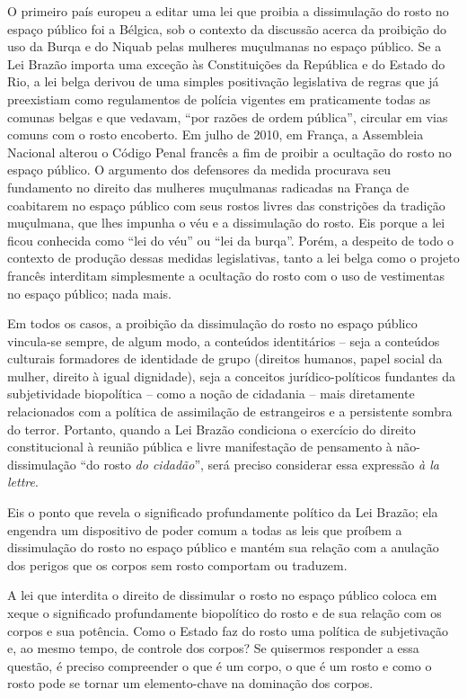 O primeiro país europeu a editar uma lei que proibia a dissimulação do
rosto no espaço público foi a Bélgica, sob o contexto da discussão
acerca da proibição do uso da Burqa e do Niquab pelas mulheres
muçulmanas no espaço público. Se a Lei Brazão importa uma exceção às
Constituições da República e do Estado do Rio, a lei belga derivou de
uma simples positivação legislativa de regras que já preexistiam como
regulamentos de polícia vigentes em praticamente todas as comunas belgas
e que vedavam, ``por razões de ordem pública'', circular em vias comuns
com o rosto encoberto. Em julho de 2010, em França, a Assembleia
Nacional alterou o Código Penal francês a fim de proibir a ocultação do
rosto no espaço público. O argumento dos defensores da medida procurava
seu fundamento no direito das mulheres muçulmanas radicadas na França de
coabitarem no espaço público com seus rostos livres das constrições da
tradição muçulmana, que lhes impunha o véu e a dissimulação do rosto.
Eis porque a lei ficou conhecida como ``lei do véu'' ou ``lei da
burqa''. Porém, a despeito de todo o contexto de produção dessas medidas
legislativas, tanto a lei belga como o projeto francês interditam
simplesmente a ocultação do rosto com o uso de vestimentas no espaço
público; nada mais.

Em todos os casos, a proibição da dissimulação do rosto no espaço
público vincula-se sempre, de algum modo, a conteúdos identitários --
seja a conteúdos culturais formadores de identidade de grupo (direitos
humanos, papel social da mulher, direito à igual dignidade), seja a
conceitos jurídico-políticos fundantes da subjetividade biopolítica --
como a noção de cidadania -- mais diretamente relacionados com a
política de assimilação de estrangeiros e a persistente sombra do
terror. Portanto, quando a Lei Brazão condiciona o exercício do direito
constitucional à reunião pública e livre manifestação de pensamento à
não-dissimulação ``do rosto \emph{do cidadão}'', será preciso considerar
essa expressão \emph{à la lettre}.

Eis o ponto que revela o significado profundamente político da Lei
Brazão; ela engendra um dispositivo de poder comum a todas as leis que
proíbem a dissimulação do rosto no espaço público e mantém sua relação
com a anulação dos perigos que os corpos sem rosto comportam ou
traduzem.

A lei que interdita o direito de dissimular o rosto no espaço público
coloca em xeque o significado profundamente biopolítico do rosto e de
sua relação com os corpos e sua potência. Como o Estado faz do rosto uma
política de subjetivação e, ao mesmo tempo, de controle dos corpos? Se
quisermos responder a essa questão, é preciso compreender o que é um
corpo, o que é um rosto e como o rosto pode se tornar um elemento-chave
na dominação dos corpos.

